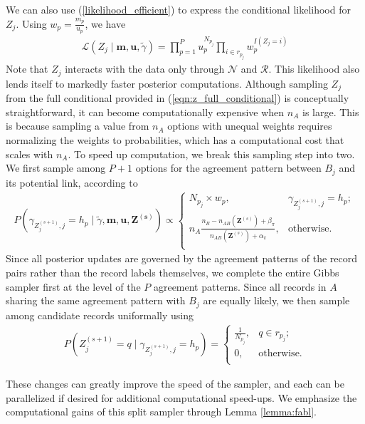 \documentclass[ba]{imsart}
\begin{document}
We can also use (\ref{likelihood_efficient}) to express the conditional likelihood for $Z_{j}$. Using $w_p = \frac{m_p}{u_p}$, we have
\begin{align}
	\mathcal{L}(Z_j\mid  \bm{m}, \bm{u}, \tilde{\gamma}) = \prod_{p=1}^P u_p^{N_{p_j}} \prod_{i \in r_{p_j}} w_p^{I(Z_j = i)}\label{likelihood_efficient_z}
\end{align}
Note that $Z_j$ interacts with the data only through $\mathcal{N}$ and $\mathcal{R}$. This likelihood also lends itself to markedly faster posterior computations. Although sampling $Z_j$ from the full conditional provided in (\ref{eqn:z_full_conditional}) is conceptually straightforward, it can become computationally expensive when $n_A$ is large. This is because sampling a value from $n_A$ options with unequal weights requires normalizing the weights to probabilities, which has a computational cost that scales with $n_A$. To speed up computation, we break this sampling step into two. We first sample among $P + 1$ options for the agreement pattern between $B_j$ and its potential link, according to
\begin{align}
	\label{eqn:gibbs1}
	P\left( \gamma_{Z_j^{(s+1)}, j} = h_p \mid \tilde{\gamma}, \bm{m}, \bm{u}, \bm{Z^{(s)}}\right) \propto
	\begin{cases} 
		N_{p_j} \times w_{p},  & \gamma_{Z_j^{(s+1)}, j} = h_p; \\
		n_A \frac{n_B - n_{AB}(\bm{Z}^{(s)}) + \beta_{\pi}}{n_{AB}(\bm{Z}^{(s)}) + \alpha_{\pi}}, &   \text{otherwise}. \\
	\end{cases}
\end{align}
Since all posterior updates are governed by the agreement patterns of the record pairs rather than the record labels themselves, we complete the entire Gibbs sampler first at the level of the $P$ agreement patterns. Since all records in $A$ sharing the same agreement pattern with $B_j$ are equally likely, we then sample among candidate records uniformally using
\begin{align}
	\label{eqn:gibbs2}
	P\left(Z_j^{(s+1)} = q \mid \gamma_{Z_j^{(s+1)}, j} = h_p \right) = \begin{cases} 
		\frac{1}{N_{p_j}}, & q \in r_{p_j}; \\
		0, & \text{otherwise.} \\
	\end{cases}
\end{align} 

These changes can greatly improve the speed of the sampler, and each can be parallelized if desired for additional computational speed-ups. We emphasize the computational gains of this split sampler through Lemma \ref{lemma:fabl}.
\end{document}
